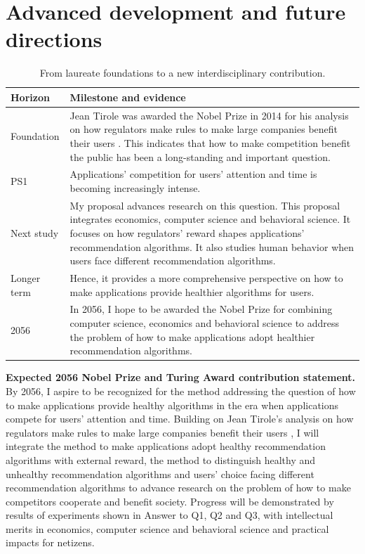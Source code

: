 \section{Advanced development and future directions}

\begin{table}[h]\caption{From laureate foundations to a new interdisciplinary contribution.}
\begin{tabularx}{\columnwidth}{@{}p{1.6cm}Y@{}}\toprule
\textbf{Horizon} & \textbf{Milestone and evidence}\\
\midrule
Foundation & Jean Tirole was awarded the Nobel Prize in 2014 for his analysis on how regulators make rules to make large companies benefit their users \cite{nobel2014}. This indicates that how to make competition benefit the public has been a long-standing and important question.\\
PS1 & Applications’ competition for users’ attention and time is becoming increasingly intense.\\
Next study & My proposal advances research on this question. This proposal integrates economics, computer science and behavioral science. It focuses on how regulators’ reward shapes applications’ recommendation algorithms. It also studies human behavior when users face different recommendation algorithms.\\
Longer term & Hence, it provides a more comprehensive perspective on how to make applications provide healthier algorithms for users.\\
2056 & In 2056, I hope to be awarded the Nobel Prize for combining computer science, economics and behavioral science to address the problem of how to make applications adopt healthier recommendation algorithms.\\
\bottomrule\end{tabularx}\end{table}

\noindent\textbf{Expected 2056 Nobel Prize and Turing Award contribution statement.}
By 2056, I aspire to be recognized for the method addressing the question of how to make applications provide healthy algorithms in the era when applications compete for users’ attention and time. Building on Jean Tirole’s analysis on how regulators make rules to make large companies benefit their users \cite{nobel2014}, I will integrate the method to make applications adopt healthy recommendation algorithms with external reward, the method to distinguish healthy and unhealthy recommendation algorithms and users’ choice facing different recommendation algorithms to advance research on the problem of how to make competitors cooperate and benefit society. Progress will be demonstrated by results of experiments shown in Answer to Q1, Q2 and Q3, with intellectual merits in economics, computer science and behavioral science and practical impacts for netizens.

